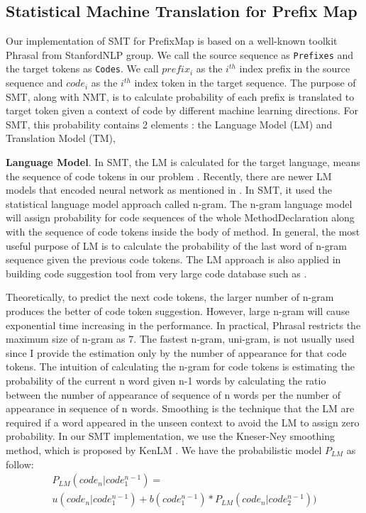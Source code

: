 \subsection{Statistical Machine Translation for Prefix Map}
Our implementation of SMT for PrefixMap is based on a well-known toolkit Phrasal \cite{021} from StanfordNLP group. We call the source sequence as \texttt{Prefixes} and the target tokens as \texttt{Codes}. We call $prefix_{i}$ as the $i^{th}$ index prefix in the source sequence and $code_{i}$ as the $i^{th}$ index token in the target sequence. The purpose of SMT, along with NMT, is to calculate probability of each prefix is translated to target token given a context of code by different machine learning directions. For SMT, this probability contains 2 elements : the Language Model (LM) and Translation Model (TM),

\textbf{Language Model}. In SMT, the LM is calculated for the target language, means the sequence of code tokens in our problem \cite{035}.  Recently, there are newer LM models that encoded neural network as mentioned in \cite{036}. In SMT, it used the statistical language model approach called n-gram. The n-gram language model will assign probability for code sequences of the whole MethodDeclaration along with the sequence of code tokens inside the body of method. In general, the most useful purpose of LM is to calculate the probability of the last word of n-gram sequence given the previous code tokens. The LM approach is also applied in building code suggestion tool from very large code database such as \cite{031} . 

Theoretically, to predict the next code tokens, the larger number of n-gram produces the better of code token suggestion. However, large n-gram will cause exponential time increasing in the performance. In practical, Phrasal restricts the maximum size of n-gram as 7. The fastest n-gram, uni-gram, is not usually used since I provide the estimation only by the number of appearance for that code tokens.  The intuition of calculating the n-gram for code tokens is estimating the probability of the current n word given n-1 words by calculating the ratio between the number of appearance of sequence of n words per the number of appearance in sequence of n words. Smoothing is the technique that the LM are required if a word appeared in the unseen context to avoid the LM to assign zero probability. In our SMT implementation, we use the Kneser-Ney smoothing method, which is proposed by KenLM \cite{034,035,037}. We have the probabilistic model $P_{LM}$ as follow:
\noindent
\begin{equation*} 
\label{eq:001}
\begin{multlined}
 P_{LM}(code_{n}|code_{1}^{n-1}) = \\ u(code_{n}|code_{1}^{n-1})+b(code_{1}^{n-1})*P_{LM}(code_{n}|code_{2}^{n-1}))
 \end{multlined}
\end{equation*}

